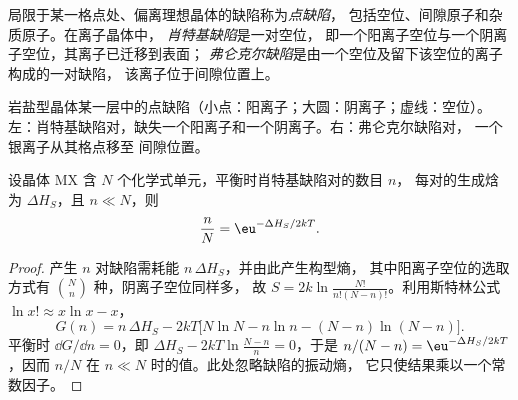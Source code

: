 \begin{definition}[点缺陷]\label{def:b3:solid-state:defects}
局限于某一格点处、偏离理想晶体的缺陷称为\emph{点缺陷}，
包括空位、间隙原子和杂质原子。在离子晶体中，
\emph{肖特基缺陷}是一对空位，
即一个阳离子空位与一个阴离子空位，其离子已迁移到表面；
\emph{弗仑克尔缺陷}是由一个空位及留下该空位的离子构成的一对缺陷，
该离子位于间隙位置上。
\end{definition}

\begin{omfigure}

{\small 岩盐型晶体某一层中的点缺陷（小点：阳离子；大圆：阴离子；虚线：空位）。
左：肖特基缺陷对，缺失一个阳离子和一个阴离子。右：弗仑克尔缺陷对，
一个银离子从其格点移至
间隙位置。}
\end{omfigure}

\begin{theorem}[肖特基缺陷的平衡浓度]\label{thm:b3:solid-state:schottky}
设晶体 MX 含 $N$ 个化学式单元，平衡时肖特基缺陷对的数目 $n$，
每对的生成焓为 $\Delta H_S$，且 $n \ll N$，则
\[
  \frac{n}{N} = \eu^{-\Delta H_S/2kT}.
\]
\end{theorem}

\begin{proof}
产生 $n$ 对缺陷需耗能 $n\,\Delta H_S$，并由此产生构型熵，
其中阳离子空位的选取方式有 $\binom{N}{n}$ 种，阴离子空位同样多，
故 $S = 2k\ln\frac{N!}{n!(N - n)!}$。利用斯特林公式 $\ln x! \approx x\ln x - x$，
\[
  G(n) = n\,\Delta H_S - 2kT\bigl[N\ln N - n\ln n - (N - n)\ln(N - n)\bigr].
\]
平衡时 $\dd G/\dd n = 0$，即 $\Delta H_S - 2kT\ln\frac{N - n}{n} = 0$，于是 $n/(N - n) = \eu^{-\Delta H_S/2kT}$，因而 $n/N$ 在
$n \ll N$ 时的值。此处忽略缺陷的振动熵，
它只使结果乘以一个常数因子。
\end{proof}

